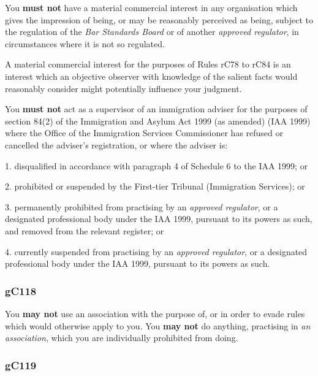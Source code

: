 
You \textcolor{myred}{\textbf{must not}} have a material commercial interest in any organisation
which gives the impression of being, or may be reasonably perceived as
being, subject to the regulation of the \emph{Bar Standards Board} or of
another \emph{approved regulator}, in circumstances where it is not so
regulated.


A material commercial interest for the purposes of Rules rC78 to rC84 is
an interest which an objective observer with knowledge of the salient
facts would reasonably consider might potentially influence your
judgment.


You \textcolor{myred}{\textbf{must not}} act as a supervisor of an immigration adviser for the
purposes of section 84(2) of the Immigration and Asylum Act 1999 (as
amended) (IAA 1999) where the Office of the Immigration Services
Commissioner has refused or cancelled the adviser's registration, or
where the adviser is:

1. disqualified in accordance with paragraph 4 of Schedule 6 to the IAA
1999; or

2. prohibited or suspended by the First-tier Tribunal (Immigration
Services); or

3. permanently prohibited from practising by an \emph{approved
regulator}, or a designated professional body under the IAA 1999,
pursuant to its powers as such, and removed from the relevant register;
or

4. currently suspended from practising by an \emph{approved regulator},
or a designated professional body under the IAA 1999, pursuant to its
powers as such.




\subsubsection{\color{darkgrey}gC118}

You \textcolor{myred}{\textbf{may not}} use an association with the purpose of, or in order to evade
rules which would otherwise apply to you. You \textcolor{myred}{\textbf{may not}} do anything,
practising in \emph{an association}, which you are individually
prohibited from doing.

\subsubsection{\color{darkgrey}gC119}

